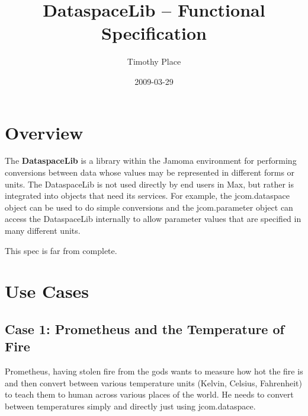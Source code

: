 \documentclass[]{article}
\title{DataspaceLib -- Functional Specification}
\author{ Timothy Place }
\date{2009-03-29}
\begin{document}
\ifpdf
{}
\else
{}
\fi

\maketitle


\begin{abstract}
\end{abstract}





\section{Overview}

The \textbf{DataspaceLib} is a library within the Jamoma environment for performing conversions between data whose values may be represented in different forms or units.  The DataspaceLib is not used directly by end users in Max, but rather is integrated into objects that need its services.  For example, the jcom.dataspace object can be used to do simple conversions and the jcom.parameter object can access the DataspaceLib internally to allow parameter values that are specified in many different units.

This spec is far from complete.



\section{Use Cases}

\subsection{Case 1: Prometheus and the Temperature of Fire}

Prometheus, having stolen fire from the gods wants to measure how hot the fire is and then convert between various temperature units (Kelvin, Celsius, Fahrenheit) to teach them to human across various places of the world.  He needs to convert between temperatures simply and directly just using jcom.dataspace.
\end{document}

